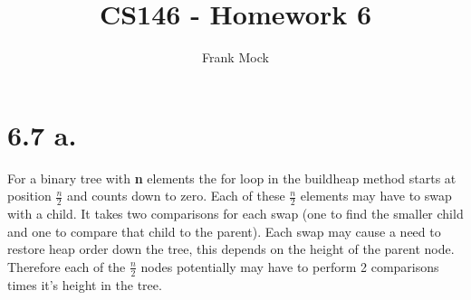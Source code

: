 \documentclass[12pt,letterpaper]{article}
\title{CS146 - Homework 6}
\author{Frank Mock}
\begin{document}
\maketitle
\section*{6.7 a.}


For a binary tree with \textbf{n} elements the for loop in the buildheap method starts at position $\frac{n}{2}$ and counts down to zero. Each of these $\frac{n}{2}$ elements may have to swap with a child. It takes two comparisons for each swap (one to find the smaller child and one to compare that child to the parent). Each swap may cause a need to restore heap order down the tree, this depends on the height of the parent node. Therefore each of the $\frac{n}{2}$ nodes potentially may have to perform 2 comparisons times it's height in the tree.
\end{document}
